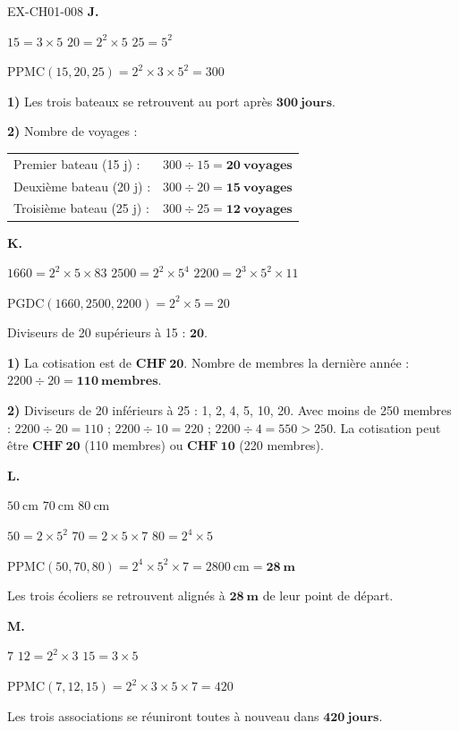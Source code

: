 \begin{solution}{EX-CH01-008}
\bigskip
\textbf{J.}

$15 = 3 \times 5$ \quad $20 = 2^2 \times 5$ \quad $25 = 5^2$

$\text{PPMC}(15, 20, 25) = 2^2 \times 3 \times 5^2 = 300$

\textbf{1)} Les trois bateaux se retrouvent au port après $\mathbf{300\ jours}$.

\textbf{2)} Nombre de voyages :

\begin{tabular}{ll}
Premier bateau (15 j) :  & $300 \div 15 = \mathbf{20\ voyages}$ \\[4pt]
Deuxième bateau (20 j) : & $300 \div 20 = \mathbf{15\ voyages}$ \\[4pt]
Troisième bateau (25 j) :& $300 \div 25 = \mathbf{12\ voyages}$ \\[4pt]
\end{tabular}

\bigskip
\textbf{K.}

$1660 = 2^2 \times 5 \times 83$ \quad $2500 = 2^2 \times 5^4$ \quad $2200 = 2^3 \times 5^2 \times 11$

$\text{PGDC}(1660, 2500, 2200) = 2^2 \times 5 = 20$

Diviseurs de 20 supérieurs à 15 : $\mathbf{20}$.

\textbf{1)} La cotisation est de $\mathbf{CHF\ 20}$. Nombre de membres la dernière année : $2200 \div 20 = \mathbf{110\ membres}$.

\textbf{2)} Diviseurs de 20 inférieurs à 25 : 1, 2, 4, 5, 10, 20. Avec moins de 250 membres : $2200 \div 20 = 110$ ; $2200 \div 10 = 220$ ; $2200 \div 4 = 550 > 250$. La cotisation peut être $\mathbf{CHF\ 20}$ (110 membres) ou $\mathbf{CHF\ 10}$ (220 membres).

\bigskip
\textbf{L.}

$50\ \text{cm}$ \quad $70\ \text{cm}$ \quad $80\ \text{cm}$

$50 = 2 \times 5^2$ \quad $70 = 2 \times 5 \times 7$ \quad $80 = 2^4 \times 5$

$\text{PPMC}(50, 70, 80) = 2^4 \times 5^2 \times 7 = 2800\ \text{cm} = \mathbf{28\ m}$

Les trois écoliers se retrouvent alignés à $\mathbf{28\ m}$ de leur point de départ.

\bigskip
\textbf{M.}

$7$ \quad $12 = 2^2 \times 3$ \quad $15 = 3 \times 5$

$\text{PPMC}(7, 12, 15) = 2^2 \times 3 \times 5 \times 7 = 420$

Les trois associations se réuniront toutes à nouveau dans $\mathbf{420\ jours}$.

\end{solution}